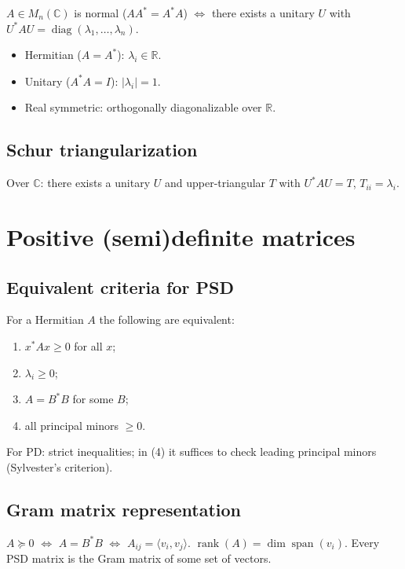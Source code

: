 $A\in M_n(\mathbb{C})$ is normal ($AA^*=A^*A$) $\iff$ there exists a unitary $U$ with $U^*AU=\operatorname{diag}(\lambda_1,\dots,\lambda_n)$.
\begin{itemize}
  \item Hermitian ($A=A^*$): $\lambda_i\in\mathbb{R}$.
  \item Unitary ($A^*A=I$): $|\lambda_i|=1$.
  \item Real symmetric: orthogonally diagonalizable over $\mathbb{R}$.
\end{itemize}

\subsection{Schur triangularization}
\label{subsec:schur-triangularization}

Over $\mathbb{C}$: there exists a unitary $U$ and upper-triangular $T$ with $U^*AU=T$, $T_{ii}=\lambda_i$.

\medskip

\section{Positive (semi)definite matrices}
\label{sec:psd}

\subsection{Equivalent criteria for PSD}
\label{subsec:psd-criteria}

For a Hermitian $A$ the following are equivalent:
\begin{enumerate}
  \item $x^*Ax\ge0$ for all $x$;
  \item $\lambda_i\ge0$;
  \item $A=B^*B$ for some $B$;
  \item all principal minors $\ge0$.
\end{enumerate}
For PD: strict inequalities; in (4) it suffices to check leading principal minors (Sylvester's criterion).

\subsection{Gram matrix representation}
\label{subsec:gram-representation}

$A\succeq0$ $\iff$ $A=B^*B$ $\iff$ $A_{ij}=\langle v_i,v_j\rangle$. $\operatorname{rank}(A)=\dim\operatorname{span}(v_i)$. Every PSD matrix is the Gram matrix of some set of vectors.

